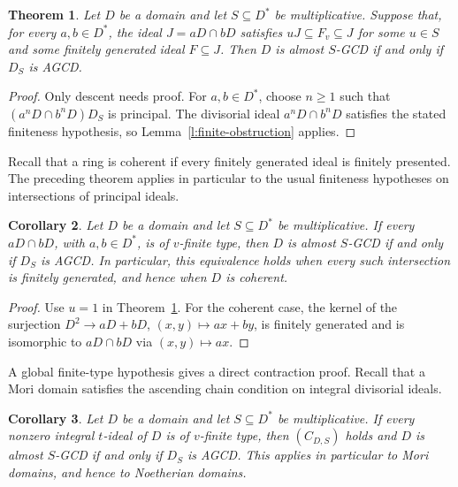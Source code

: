 \documentclass[11pt]{amsart}
\newtheorem{theorem}{Theorem}[section]
\newtheorem{corollary}[theorem]{Corollary}
\theoremstyle{definition}
\theoremstyle{remark}
\begin{document}
\begin{theorem}\label{t:finite-conductor-localization}
Let $D$ be a domain and let $S\subseteq D^\ast$ be multiplicative.
Suppose that, for every $a,b\in D^\ast$, the ideal $J=aD\cap bD$
satisfies $uJ\subseteq F_v\subseteq J$ for some $u\in S$ and
some finitely generated ideal $F\subseteq J$. Then $D$ is almost
$S$-GCD if and only if $D_S$ is AGCD.
\end{theorem}

\begin{proof}
Only descent needs proof. For $a,b\in D^\ast$, choose $n\geq1$
such that $(a^nD\cap b^nD)D_S$ is principal. The divisorial ideal
$a^nD\cap b^nD$ satisfies the stated finiteness hypothesis, so
Lemma~\ref{l:finite-obstruction} applies.
\end{proof}

Recall that a ring is coherent if every finitely generated ideal is
finitely presented. The preceding theorem applies in particular to
the usual finiteness hypotheses on intersections of principal ideals.

\begin{corollary}\label{c:finite-conductor}
Let $D$ be a domain and let $S\subseteq D^\ast$ be multiplicative.
If every $aD\cap bD$, with $a,b\in D^\ast$, is of $v$-finite type,
then $D$ is almost $S$-GCD if and only if $D_S$ is AGCD.
In particular, this equivalence holds when every such intersection
is finitely generated, and hence when $D$ is coherent.
\end{corollary}

\begin{proof}
Use $u=1$ in Theorem~\ref{t:finite-conductor-localization}.
For the coherent case, the kernel of the surjection
$D^2\longrightarrow aD+bD$, $(x,y)\mapsto ax+by$, is finitely
generated and is isomorphic to $aD\cap bD$ via $(x,y)\mapsto ax$.
\end{proof}

A global finite-type hypothesis gives a direct contraction proof.
Recall that a Mori domain satisfies the ascending chain condition
on integral divisorial ideals.

\begin{corollary}\label{c:tfinite-localization-criterion}
Let $D$ be a domain and let $S\subseteq D^\ast$ be multiplicative.
If every nonzero integral $t$-ideal of $D$ is of $v$-finite type,
then $(C_{D,S})$ holds and $D$ is almost $S$-GCD if and only if
$D_S$ is AGCD. This applies in particular to Mori domains, and
hence to Noetherian domains.
\end{corollary}
\end{document}
